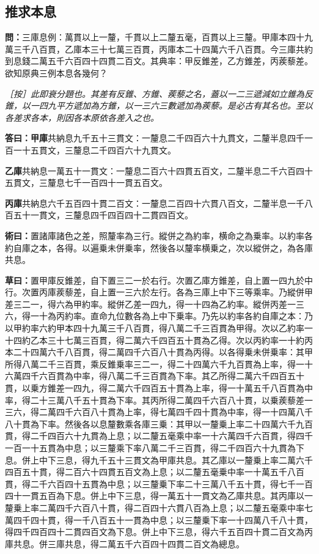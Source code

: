 \documentclass[11pt,a4paper]{article}
\newcommand{\Question}[1]{\par\noindent\textbf{\color{problemcolor}問：}#1\par}
\newcommand{\Answer}[1]{\par\noindent\textbf{\color{answercolor}答曰：}#1\par}
\newcommand{\Method}[1]{\par\noindent\textbf{\color{methodcolor}術曰：}#1\par}
\newcommand{\Working}[1]{\par\noindent\textbf{草曰：}#1\par}
\newcommand{\EditorialNote}[1]{\par\noindent\textit{［按］#1}\par}
\begin{document}
\subsection*{\color{sectioncolor}推求本息}

\Question{三庫息例：萬貫以上一釐，千貫以上二釐五毫，百貫以上三釐。甲庫本四十九萬三千八百貫，乙庫本三十七萬三百貫，丙庫本二十四萬六千八百貫。今三庫共約到息錢二萬五千六百四十四貫二百文。其典率：甲反錐差，乙方錐差，丙蒺藜差。欲知原典三例本息各幾何？}

\EditorialNote{此即衰分題也。其差有反錐、方錐、蒺藜之名，蓋以一二三遞減如立錐為反錐，以一四九平方遞加為方錐，以一三六三數遞加為蒺藜。是必古有其名也。至以各差求各本，則因各本原依各差入之也。}

\Answer{\textbf{甲庫}共納息九千五十三貫文：一釐息二千四百六十九貫文，二釐半息四千一百一十五貫文，三釐息二千四百六十九貫文。

\textbf{乙庫}共納息一萬五十一貫文：一釐息二百六十四貫五百文，二釐半息二千六百四十五貫文，三釐息七千一百四十一貫五百文。

\textbf{丙庫}共納息六千五百四十貫二百文：一釐息二百四十六貫八百文，二釐半息一千八百五十一貫文，三釐息四千四百四十二貫四百文。}

\Method{置諸庫諸色之差，照釐率為三行。縱併之為約率，横命之為乗率。以約率各約自庫之本，各得。以遍乗未併乗率，然後各以釐率横乗之，次以縱併之，為各庫共息。}

\Working{置甲庫反錐差，自下置三二一於右行。次置乙庫方錐差，自上置一四九於中行。次置丙庫蒺藜差，自上置一三六於左行。各為三庫上中下三等乘率。乃縱併甲差三二一，得六為甲約率。縱併乙差一四九，得一十四為乙約率。縱併丙差一三六，得一十為丙約率。直命九位數各為上中下乗率。乃先以約率各約自庫之本：乃以甲約率六約甲本四十九萬三千八百貫，得八萬二千三百貫為甲得。次以乙約率一十四約乙本三十七萬三百貫，得二萬六千四百五十貫為乙得。次以丙約率一十約丙本二十四萬六千八百貫，得二萬四千六百八十貫為丙得。以各得乗未併乗率：其甲所得八萬二千三百貫，乘反錐乗率三二一，得二十四萬六千九百貫為上率，得一十六萬四千六百貫為中率，得八萬二千三百貫為下率。其乙所得二萬六千四百五十貫，以乗方錐差一四九，得二萬六千四百五十貫為上率，得一十萬五千八百貫為中率，得二十三萬八千五十貫為下率。其丙所得二萬四千六百八十貫，以乗蒺藜差一三六，得二萬四千六百八十貫為上率，得七萬四千四十貫為中率，得一十四萬八千八十貫為下率。然後各以息釐數乘各庫三乗：其甲以一釐乗上率二十四萬六千九百貫，得二千四百六十九貫為上息；以二釐五毫乘中率一十六萬四千六百貫，得四千一百一十五貫為中息；以三釐乘下率八萬二千三百貫，得二千四百六十九貫為下息。併上中下三息，得九千五十三貫文為甲庫共息。其乙庫以一釐乗上率二萬六千四百五十貫，得二百六十四貫五百文為上息；以二釐五毫乗中率一十萬五千八百貫，得二千六百四十五貫為中息；以三釐乗下率二十三萬八千五十貫，得七千一百四十一貫五百為下息。併上中下三息，得一萬五十一貫文為乙庫共息。其丙庫以一釐乗上率二萬四千六百八十貫，得二百四十六貫八百為上息；以二釐五毫乘中率七萬四千四十貫，得一千八百五十一貫為中息；以三釐乗下率一十四萬八千八十貫，得四千四百四十二貫四百文為下息。併上中下三息，得六千五百四十貫二百文為丙庫共息。併三庫共息，得二萬五千六百四十四貫二百文為總息。}
\end{document}
